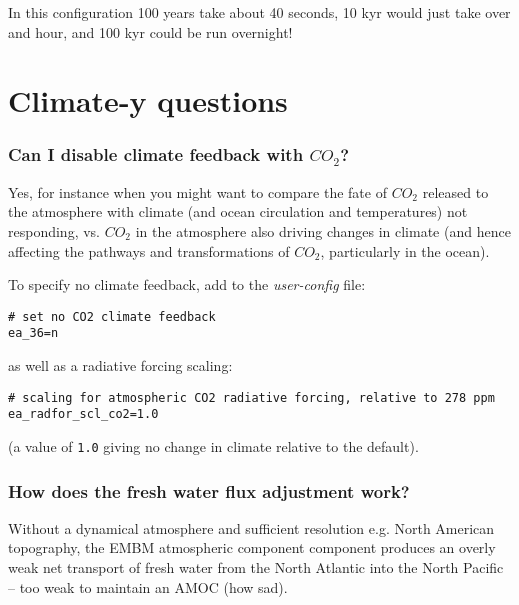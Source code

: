 \documentclass[11pt,fleqn]{book} %
\begin{document}
In this configuration 100 years take about 40 seconds, 10 kyr would just take over and hour, and 100 kyr could be run overnight!


\newpage


\section{Climate-y questions}

%
\subsubsection{Can I disable climate feedback with \(CO_{2}\)?}

Yes, for instance when you might want to compare the fate of \(CO_{2}\) released to the atmosphere with climate (and ocean circulation and temperatures) not responding, vs. \(CO_{2}\) in the atmosphere also driving changes in climate (and hence affecting the pathways and transformations of \(CO_{2}\), particularly in the ocean).

\vspace{2mm}
To specify no climate feedback, add to the \textit{user-config} file:
\vspace{-2mm}\small\begin{verbatim}
# set no CO2 climate feedback
ea_36=n
\end{verbatim}\normalsize\vspace{-2mm}
as well as a radiative forcing scaling:
\vspace{-2mm}\small\begin{verbatim}
# scaling for atmospheric CO2 radiative forcing, relative to 278 ppm
ea_radfor_scl_co2=1.0
\end{verbatim}\normalsize\vspace{-2mm}
(a value of \texttt{1.0} giving no change in climate relative to the default).

%
\subsubsection{How does the fresh water flux adjustment work?}

Without a dynamical atmosphere and sufficient resolution e.g. North American topography, the EMBM atmospheric component component produces an overly weak net transport of fresh water from the North Atlantic into the North Pacific -- too weak to maintain an AMOC (how sad).
\end{document}

